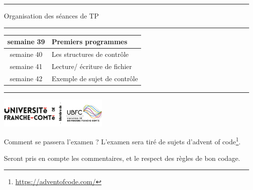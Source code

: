 \documentclass[10pt, a4paper]{article}
\begin{document}
\begin{titlepage}
\begin{center}
    \vspace{1cm}

\begin{center}
  \noindent\rule{4cm}{0.6pt}  Organisation des séances de TP   \noindent\rule{4cm}{0.4pt}  
    
\end{center}
        \begin{tabular}{|c|l|}\hline
             semaine 39& Premiers programmes   \\\hline
             semaine 40& Les structures de contrôle   \\\hline
             semaine 41& Lecture/ écriture de fichier  \\\hline
             semaine 42& Exemple de sujet de contrôle  \\\hline
        \end{tabular}

    \vspace{0.5cm}
        
    \noindent\rule{12cm}{0.6pt}
        \vfill
        \includegraphics[width=0.4\textwidth]{logo.png}
        \\            
    \end{center}  
\end{titlepage}








\newpage



\begin{tcolorbox}[lefttitle=2cm, colframe=gray!75!black, title= \textbf{Examen des connaissances pratiques}]
Comment se passera l'examen ?
L'examen sera tiré de sujets d'advent of code\footnote{\url{https://adventofcode.com/} }.

Seront pris en compte les commentaires, et le respect des règles de bon codage.

\end{tcolorbox}
\end{document}
